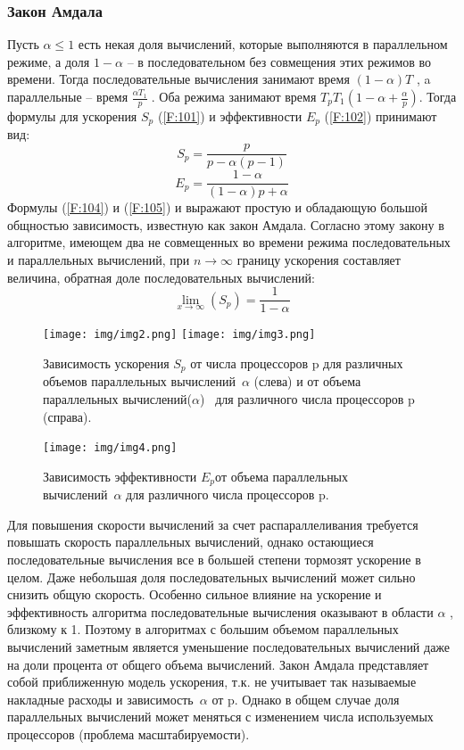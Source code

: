 \subsubsection{Закон Амдала}
Пусть $\alpha\leq 1$ есть некая доля вычислений, которые выполняются в параллельном режиме, а доля $1-\alpha$  – в последовательном без совмещения этих режимов во времени. Тогда последовательные вычисления занимают время $(1-\alpha)T$ , a параллельные – время $\frac{\alpha T_{1}}{p}\;$. Оба режима занимают время $T_{p}T_{1}(1-\alpha+\frac{\alpha}{p})$.
Тогда формулы для ускорения $S_{p}$ (\ref{F:101}) и эффективности  $E_{p}$ (\ref{F:102}) принимают вид:
\begin{equation}
S_{p}=\frac{p}{p-\alpha(p-1)}
\label{F:104}
\end{equation}
\begin{equation}
E_{p}=\frac{1-\alpha}{(1-\alpha)p +\alpha}
\label{F:105}
\end{equation} 
Формулы (\ref{F:104})  и (\ref{F:105}) и выражают простую и обладающую большой общностью зависимость, известную как закон Амдала. Согласно этому закону в алгоритме, имеющем два не совмещенных во времени режима последовательных и параллельных вычислений, при  $n\to\infty $ границу ускорения составляет величина, обратная доле последовательных вычислений:
\begin{equation}
\lim_{x \to \infty} \left(S_{p} \right) = \frac{1}{1-\alpha} 
\label{F:106}
\end{equation} 
\begin{figure}[h!]
	\centering
	\texttt{[image: img/img2.png]}
	\texttt{[image: img/img3.png]}
	\caption{Зависимость ускорения $S_{p}$ от числа процессоров p для различных объемов параллельных вычислений $\alpha$ (слева) и от объема параллельных вычислений($\alpha$)  для различного числа процессоров p (справа).}
	\label{fig:spire06}
\end{figure}
\begin{figure}[h!]
	\centering
	\texttt{[image: img/img4.png]}

	\caption{Зависимость эффективности $E_{p}$от объема параллельных вычислений $\alpha$ для различного числа процессоров p.}
	\label{fig:spire07}
\end{figure}
Для повышения скорости вычислений за счет распараллеливания требуется повышать скорость параллельных вычислений, однако остающиеся последовательные вычисления все в большей степени тормозят ускорение в целом. Даже небольшая доля последовательных вычислений может сильно снизить общую скорость. 
Особенно сильное влияние на ускорение и эффективность алгоритма последовательные вычисления оказывают в области $\alpha$ , близкому к 1. Поэтому в алгоритмах с большим объемом параллельных вычислений заметным является уменьшение последовательных вычислений даже на доли процента от общего объема вычислений. 
Закон Амдала представляет собой приближенную модель ускорения, т.к. не учитывает так называемые накладные расходы и зависимость $\alpha$ от p. Однако в общем случае доля параллельных вычислений может меняться с изменением числа используемых процессоров (проблема масштабируемости).


